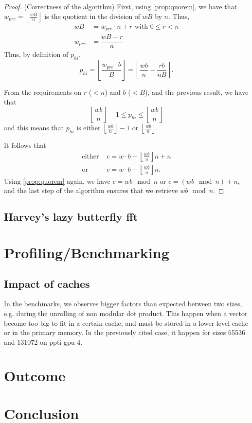 \documentclass[a4paper]{article}
\begin{document}
\begin{proof} (Correctness of the algorithm)
First, using \autoref{prop:quorem}, we have that $w_{pre}= \left\lfloor\frac{wB}{n}\right\rfloor $ is the quotient in the division of $wB$ by $n$. Thus,
\begin{align*}
wB &= w_{pre}\cdot n + r \text{ with } 0 \leq r < n \\
w_{pre} &= \dfrac{wB - r}{n}
\end{align*}
Thus, by definition of $p_{hi}$,
\[
p_{hi} = \left\lfloor\frac{w_{pre}\cdot b}{B}\right\rfloor
= \left\lfloor\dfrac{wb}{n} - \dfrac{rb}{nB} \right\rfloor.
\]

From the requirements on $r$ ($<n$) and $b$ ($<B$), and the previous result, we have that
\[
\left\lfloor\dfrac{wb}{n}\right\rfloor - 1 \leq p_{hi} \leq \left\lfloor\dfrac{wb}{n}\right\rfloor
\]
and this means that $p_{hi}$ is either $\left\lfloor\frac{wb}{n}\right\rfloor - 1$ or $\left\lfloor\frac{wb}{n}\right\rfloor$.


It follows that 
\begin{align*}
\text{either } &c=w\cdot b - \left\lfloor\frac{wb}{n}\right\rfloor n + n \\
\text{or } &c=w\cdot b - \left\lfloor\frac{wb}{n}\right\rfloor n.
\end{align*}
Using \autoref{prop:quorem} again, we have $c=wb \mod n$ or $c=(wb \mod n)+n$, and the last step of the algorithm ensures that we retrieve $wb \mod n$.
\end{proof}

\subsection{Harvey's lazy butterfly fft}

\section{Profiling/Benchmarking}

\subsection{Impact of caches} %

In the benchmarks, we observes bigger factors than expected between two sizes,
e.g. during the unrolling of non modular dot product. This happen when a vector
become too big to fit in a certain cache, and must be stored in a lower level
cache or in the primary memory. In the previously cited case, it happen for sizes
65536 and 131072 on ppti-gpu-4. %

\section{Outcome}

\section{Conclusion}

\newpage
 
 
\nocite{*}
\end{document}
